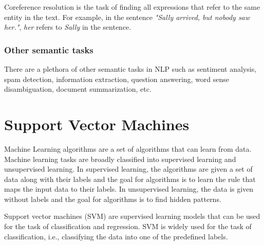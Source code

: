 Coreference resolution is the task of finding all expressions that refer to the same entity in the text. For example, in the sentence \textit{"Sally arrived, but nobody saw her."}, \textit{her} refers to \textit{Sally} in the sentence.

\subsubsection{Other semantic tasks}

There are a plethora of other semantic tasks in NLP such as sentiment analysis, spam detection, information extraction, question answering, word sense disambiguation, document summarization, etc.



\section{Support Vector Machines}\label{sec:SVM}

Machine Learning algorithms are a set of algorithms that can learn from data. Machine learning tasks are broadly classified into supervised learning and unsupervised learning. In supervised learning, the algorithms are given a set of data along with their labels and the goal for algorithms is to learn the rule that maps the input data to their labels. In unsupervised learning, the data is given without labels and the goal for algorithms is to find hidden patterns.

Support vector machines (SVM) are supervised learning models that can be used for the task of classification and regression. SVM is widely used for the task of classification, i.e., classifying the data into one of the predefined labels.

